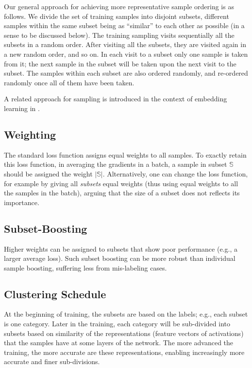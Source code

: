 \documentclass{article} %
\begin{document}
Our general approach for achieving more representative sample ordering is as follows. We divide the set of training samples into disjoint subsets, different samples within the same subset being as ``similar'' to each other as possible (in a sense to be discussed below). The training sampling visits sequentially all the subsets in a random order. After visiting all the subsets, they are visited again in a new random order, and so on. In each visit to a subset only one sample is taken from it; the next sample in the subset will be taken upon the next visit to the subset. The samples within each subset are also ordered randomly, and re-ordered randomly once all of them have been taken.

A related approach for sampling is introduced in the context of embedding learning in \cite{WMSK}.

\subsection{Weighting}
The standard loss function assigns equal weights to all samples. To exactly retain this loss function, in averaging the gradients in a batch, a sample in subset $\mathbb{S}$ should be assigned the weight $|\mathbb{S}|$. Alternatively, one can change the loss function, for example by giving all \emph{subsets} equal weights (thus using equal weights to all the samples in the batch), arguing that the size of a subset does not reflects its importance. 

\subsection{Subset-Boosting}
Higher weights can be assigned to subsets that show poor performance (e.g., a larger average loss). Such subset boosting can be more robust than individual sample boosting, suffering less from mis-labeling cases. 

\subsection{Clustering Schedule}
At the beginning of training, the subsets are based on the labels; e.g., each subset is one category. Later in the training, each category will be sub-divided into subsets based on similarity of the representations (feature vectors of activations) that the samples have at some layers of the network. The more advanced the training, the more accurate are these representations, enabling increasingly more accurate and finer sub-divisions.
\end{document}
